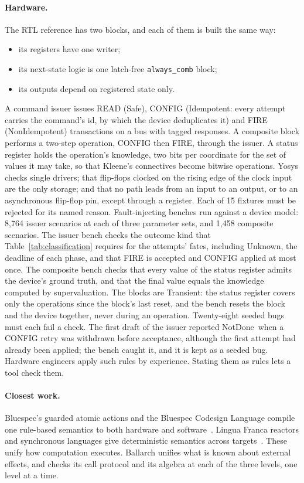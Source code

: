 \documentclass[11pt]{article}
\theoremstyle{definition}
\theoremstyle{plain}
\newcommand{\NotDone}{\textsf{NotDone}}
\newcommand{\Unknown}{\textsf{Unknown}}
\newcommand{\Safe}{\textsf{Safe}}
\newcommand{\Idem}{\textsf{Idempotent}}
\newcommand{\NonIdem}{\textsf{NonIdempotent}}
\begin{document}
\paragraph{Hardware.} The RTL reference has two blocks, and each of them is built the same way:
\begin{itemize}[nosep]
  \item its registers have one writer;
  \item its next-state logic is one latch-free \texttt{always\_comb} block;
  \item its outputs depend on registered state only.
\end{itemize}
A command issuer issues READ (\Safe), CONFIG (\Idem: every attempt carries the command's id, by which the device deduplicates it) and FIRE (\NonIdem) transactions on a bus with tagged responses. A composite block performs a two-step operation, CONFIG then FIRE, through the issuer. A status register holds the operation's knowledge, two bits per coordinate for the set of values it may take, so that Kleene's connectives become bitwise operations. Yosys checks single drivers; that flip-flops clocked on the rising edge of the clock input are the only storage; and that no path leads from an input to an output, or to an asynchronous flip-flop pin, except through a register. Each of 15 fixtures must be rejected for its named reason. Fault-injecting benches run against a device model: 8{,}764 issuer scenarios at each of three parameter sets, and 1{,}458 composite scenarios. The issuer bench checks the outcome kind that Table~\ref{tab:classification} requires for the attempts' fates, including \Unknown, the deadline of each phase, and that FIRE is accepted and CONFIG applied at most once. The composite bench checks that every value of the status register admits the device's ground truth, and that the final value equals the knowledge computed by supervaluation. The blocks are Transient: the status register covers only the operations since the block's last reset, and the bench resets the block and the device together, never during an operation. Twenty-eight seeded bugs must each fail a check. The first draft of the issuer reported \NotDone\ when a CONFIG retry was withdrawn before acceptance, although the first attempt had already been applied; the bench caught it, and it is kept as a seeded bug. Hardware engineers apply such rules by experience. Stating them as rules lets a tool check them.

\paragraph{Closest work.} Bluespec's guarded atomic actions and the Bluespec Codesign Language compile one rule-based semantics to both hardware and software~\citep{Nikhil2004Bluespec,KingDaveArvind2012}. Lingua Franca reactors and synchronous languages give deterministic semantics across targets~\citep{Lohstroh2021LinguaFranca,BerryGonthier1992,Halbwachs1991Lustre}. These unify how computation executes. Ballarch unifies what is known about external effects, and checks its call protocol and its algebra at each of the three levels, one level at a time.
\end{document}
